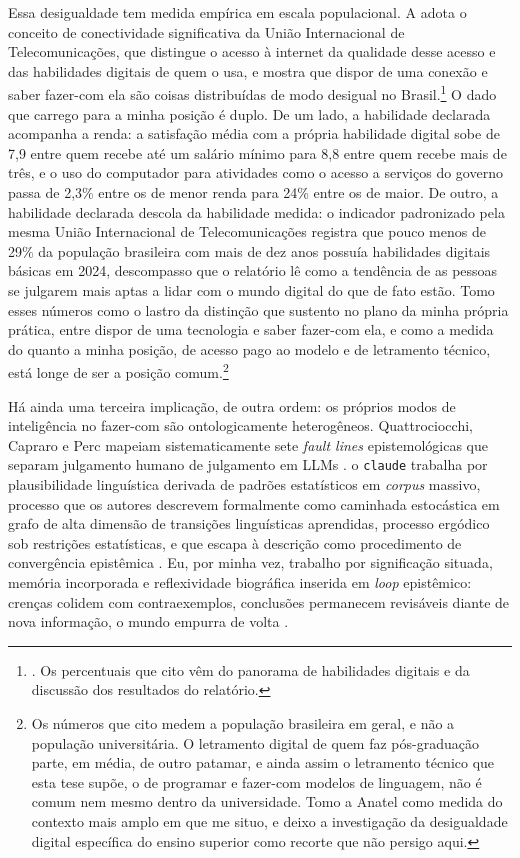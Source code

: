 Essa desigualdade tem medida empírica em escala populacional. A \textcite{Anatel2025Conectividade} adota o conceito de conectividade significativa da União Internacional de Telecomunicações, que distingue o acesso à internet da qualidade desse acesso e das habilidades digitais de quem o usa, e mostra que dispor de uma conexão e saber fazer-com ela são coisas distribuídas de modo desigual no Brasil.\footnote{\textcite{Anatel2025Conectividade}. Os percentuais que cito vêm do panorama de habilidades digitais e da discussão dos resultados do relatório.} O dado que carrego para a minha posição é duplo. De um lado, a habilidade declarada acompanha a renda: a satisfação média com a própria habilidade digital sobe de 7,9 entre quem recebe até um salário mínimo para 8,8 entre quem recebe mais de três, e o uso do computador para atividades como o acesso a serviços do governo passa de 2,3\% entre os de menor renda para 24\% entre os de maior. De outro, a habilidade declarada descola da habilidade medida: o indicador padronizado pela mesma União Internacional de Telecomunicações registra que pouco menos de 29\% da população brasileira com mais de dez anos possuía habilidades digitais básicas em 2024, descompasso que o relatório lê como a tendência de as pessoas se julgarem mais aptas a lidar com o mundo digital do que de fato estão. Tomo esses números como o lastro da distinção que sustento no plano da minha própria prática, entre dispor de uma tecnologia e saber fazer-com ela, e como a medida do quanto a minha posição, de acesso pago ao modelo e de letramento técnico, está longe de ser a posição comum.\footnote{Os números que cito medem a população brasileira em geral, e não a população universitária. O letramento digital de quem faz pós-graduação parte, em média, de outro patamar, e ainda assim o letramento técnico que esta tese supõe, o de programar e fazer-com modelos de linguagem, não é comum nem mesmo dentro da universidade. Tomo a Anatel como medida do contexto mais amplo em que me situo, e deixo a investigação da desigualdade digital específica do ensino superior como recorte que não persigo aqui.}

Há ainda uma terceira implicação, de outra ordem: os próprios modos de inteligência no fazer-com são ontologicamente heterogêneos. Quattrociocchi, Capraro e Perc mapeiam sistematicamente sete \textit{fault lines} epistemológicas que separam julgamento humano de julgamento em LLMs \parencite{Quattrociocchi2025Epistemological}. o \texttt{claude} trabalha por plausibilidade linguística derivada de padrões estatísticos em \textit{corpus} massivo, processo que os autores descrevem formalmente como caminhada estocástica em grafo de alta dimensão de transições linguísticas aprendidas, processo ergódico sob restrições estatísticas, e que escapa à descrição como procedimento de convergência epistêmica \parencite[p.~3]{Quattrociocchi2025Epistemological}. Eu, por minha vez, trabalho por significação situada, memória incorporada e reflexividade biográfica inserida em \textit{loop} epistêmico: crenças colidem com contraexemplos, conclusões permanecem revisáveis diante de nova informação, o mundo empurra de volta \parencite[p.~4]{Quattrociocchi2025Epistemological}.

